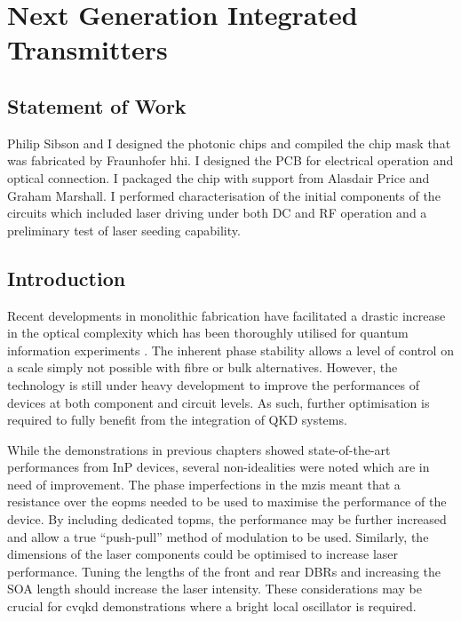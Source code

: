 %
\graphicspath{{./chapters/chapter06/fig06/}}

\let\textcircled=\pgftextcircled
\chapter{Next Generation Integrated Transmitters}
\label{chap:future}

\section*{Statement of Work}

Philip Sibson and I designed the photonic chips and compiled the chip mask that was fabricated by Fraunhofer \acl{hhi}. I designed the PCB for electrical operation and optical connection. I packaged the chip with support from Alasdair Price and Graham Marshall. I performed characterisation of the initial components of the circuits which included laser driving under both DC and RF operation and a preliminary test of laser seeding capability.

\section{Introduction}

Recent developments in monolithic fabrication have facilitated a drastic increase in the optical complexity which has been thoroughly utilised for quantum information experiments \cite{wang2019integrated}. The inherent phase stability allows a level of control on a scale simply not possible with fibre or bulk alternatives. However, the technology is still under heavy development to improve the performances of devices at both component and circuit levels. As such, further optimisation is required to fully benefit from the integration of \ac{QKD} systems. 

While the demonstrations in previous chapters showed state-of-the-art performances from \ac{InP} devices, several non-idealities were noted which are in need of improvement. The phase imperfections in the \acp{mzi} meant that a resistance over the \acp{eopm} needed to be used to maximise the performance of the device. By including dedicated \acp{topm}, the performance may be further increased and allow a true ``push-pull'' method of modulation to be used. Similarly, the dimensions of the laser components could be optimised to increase laser performance. Tuning the lengths of the front and rear \acp{DBR} and increasing the \ac{SOA} length should increase the laser intensity. These considerations may be crucial for \ac{cvqkd} demonstrations where a bright local oscillator is required. 

